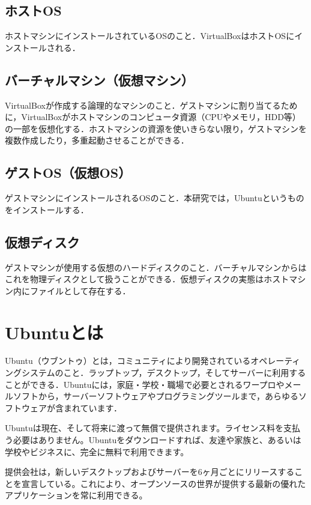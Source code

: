 \subsection{ホストOS}

ホストマシンにインストールされているOSのこと．VirtualBoxはホストOSにインストールされる．

\subsection{バーチャルマシン（仮想マシン）}

VirtualBoxが作成する論理的なマシンのこと．ゲストマシンに割り当てるために，VirtualBoxがホストマシンのコンピュータ資源（CPUやメモリ，HDD等）の一部を仮想化する．ホストマシンの資源を使いきらない限り，ゲストマシンを複数作成したり，多重起動させることができる．

\subsection{ゲストOS（仮想OS）}

ゲストマシンにインストールされるOSのこと．本研究では，Ubuntuというものをインストールする．

\subsection{仮想ディスク}

ゲストマシンが使用する仮想のハードディスクのこと．バーチャルマシンからはこれを物理ディスクとして扱うことができる．仮想ディスクの実態はホストマシン内にファイルとして存在する．



\section{Ubuntuとは}

Ubuntu（ウブントゥ）とは，コミュニティにより開発されているオペレーティングシステムのこと．ラップトップ，デスクトップ，そしてサーバーに利用することができる．Ubuntuには，家庭・学校・職場で必要とされるワープロやメールソフトから，サーバーソフトウェアやプログラミングツールまで，あらゆるソフトウェアが含まれています．

Ubuntuは現在、そして将来に渡って無償で提供されます。ライセンス料を支払う必要はありません。Ubuntuをダウンロードすれば、友達や家族と、あるいは学校やビジネスに、完全に無料で利用できます。

提供会社は，新しいデスクトップおよびサーバーを6ヶ月ごとにリリースすることを宣言している。これにより、オープンソースの世界が提供する最新の優れたアプリケーションを常に利用できる。

